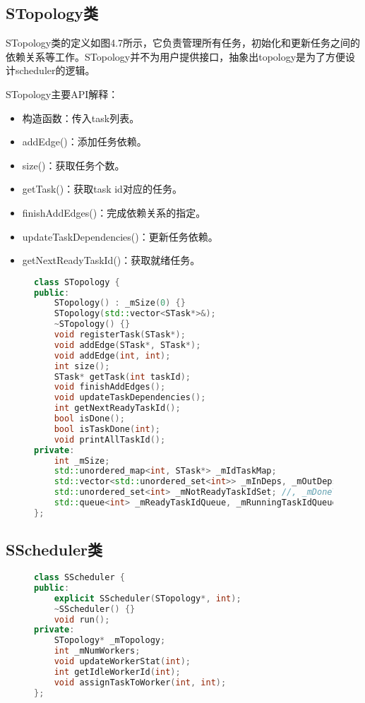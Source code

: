 \subsection{STopology类}

STopology类的定义如图4.7所示，它负责管理所有任务，初始化和更新任务之间的依赖关系等工作。STopology并不为用户提供接口，抽象出topology是为了方便设计scheduler的逻辑。

STopology主要API解释：

\begin{itemize}
	\item 构造函数：传入task列表。
	\item addEdge()：添加任务依赖。
	\item size()：获取任务个数。
	\item getTask()：获取task id对应的任务。
	\item finishAddEdges()：完成依赖关系的指定。
	\item updateTaskDependencies()：更新任务依赖。
	\item getNextReadyTaskId()：获取就绪任务。
\end{itemize}

\begin{figure}[!htbp]
    \centering
\begin{lstlisting}[language=c++,caption={}]
class STopology {
public:
    STopology() : _mSize(0) {}
    STopology(std::vector<STask*>&);
    ~STopology() {}
    void registerTask(STask*);
    void addEdge(STask*, STask*);
    void addEdge(int, int);
    int size();
    STask* getTask(int taskId);
    void finishAddEdges();
    void updateTaskDependencies();
    int getNextReadyTaskId();
    bool isDone();
    bool isTaskDone(int);
    void printAllTaskId();
private:
    int _mSize;
    std::unordered_map<int, STask*> _mIdTaskMap;
    std::vector<std::unordered_set<int>> _mInDeps, _mOutDeps;
    std::unordered_set<int> _mNotReadyTaskIdSet; //, _mDoneTaskIdSet;
    std::queue<int> _mReadyTaskIdQueue, _mRunningTaskIdQueue, _mDoneTaskIdQueue;
};
\end{lstlisting}
    \label{fig:4_stopology}
\end{figure}

\subsection{SScheduler类}

\begin{figure}[!htbp]
    \centering
\begin{lstlisting}[language=c++,caption={}]
class SScheduler {
public:
    explicit SScheduler(STopology*, int);
    ~SScheduler() {}
    void run();
private:
    STopology* _mTopology;
    int _mNumWorkers;
    void updateWorkerStat(int);
    int getIdleWorkerId(int);
    void assignTaskToWorker(int, int);
};
\end{lstlisting}
    \label{fig:4_sscheduler}
\end{figure}

